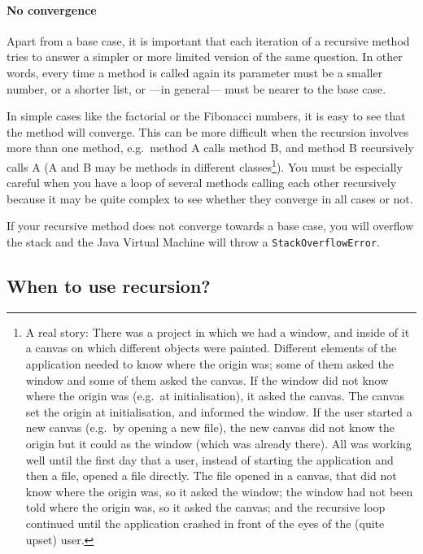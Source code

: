 \paragraph{No convergence}
\label{sec:no-convergence}

Apart from a base case, it is important that each iteration of a
recursive method tries to answer a simpler or more limited version of
the same question. In other words, every time a method is called again
its parameter must be a smaller number, or a shorter list, or ---in
general--- must be nearer to the base case. 

In simple cases like the factorial or the Fibonacci numbers, it is
easy to see that the method will converge. This can be more difficult
when the recursion involves more than one method, e.g.~method A calls
method B, and method B recursively calls A (A and B may be methods in
different classes\footnote{A real story: There was a project in which
  we had a window, and inside of it a canvas on which different
  objects were painted. Different elements of the application needed
  to know where the origin was; some of them asked the window and some
  of them asked the canvas. If the window did not know where the
  origin was (e.g.~at initialisation), it asked the canvas. The canvas
  set the origin at initialisation, and informed the window. If the
  user started a new canvas (e.g.~by opening a new file), the new
  canvas did not know the origin but it could as the window (which was
  already there). All was working well until the first day that a
  user, instead of starting the application and then a file, opened a
  file directly. The file opened in a canvas, that did not know where
  the origin was, so it asked the window; the window had not been told
  where the origin was, so it asked the canvas; and the recursive loop
  continued until the application crashed in front of the eyes of the
  (quite upset) user.}). You must be especially careful when you have
a loop of several methods calling each other recursively because it
may be quite complex to see whether they converge in all cases or not.

If your recursive method does not converge towards a base case, you
will overflow the stack and the Java Virtual Machine will throw a
\verb+StackOverflowError+. 

\subsection{When to use recursion?}
\label{sec:when-use-recursion}

